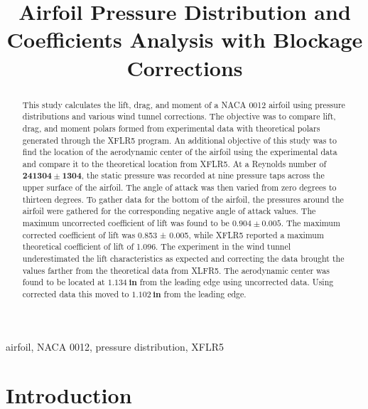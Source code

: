 \documentclass[journal,letterpaper]{IEEEtran}
\begin{document}
\title{Airfoil Pressure Distribution and Coefficients Analysis with Blockage Corrections}

\author{
}

\maketitle
\thispagestyle{empty}

\begin{abstract}
This study calculates the lift, drag, and moment of a NACA 0012 airfoil using pressure distributions and various wind tunnel corrections.
The objective was to compare lift, drag, and moment polars formed from experimental data with theoretical polars generated through the XFLR5 program.
An additional objective of this study was to find the location of the aerodynamic center of the airfoil using the experimental data and compare it to the theoretical location from XFLR5.
At a Reynolds number of $\bm{241304 \pm 1304}$, the static pressure was recorded at nine pressure taps across the upper surface of the airfoil.
The angle of attack was then varied from zero degrees to thirteen degrees.
To gather data for the bottom of the airfoil, the pressures around the airfoil were gathered for the corresponding negative angle of attack values.
The maximum uncorrected coefficient of lift was found to be $\bm{0.904 \pm 0.005}$.
The maximum corrected coefficient of lift was 0.853 ± 0.005, while XFLR5 reported a maximum theoretical coefficient of lift of 1.096.
The experiment in the wind tunnel underestimated the lift characteristics as expected and correcting the data brought the values farther from the theoretical data from XLFR5.
The aerodynamic center was found to be located at $\mathbf{\qty{1.134}{in}}$ from the leading edge using uncorrected data.
Using corrected data this moved to $\mathbf{\qty{1.102}{in}}$ from the leading edge.
\end{abstract}

\begin{IEEEkeywords}
airfoil, NACA 0012, pressure distribution, XFLR5
\end{IEEEkeywords}


\section{Introduction}
\end{document}
